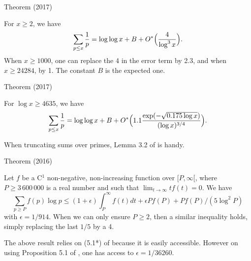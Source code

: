 \par 
\begin{thm}{Theorem (2017)}

  For $x\ge 2$, we have
  $$
  \sum_{p\le x}\frac1p=\log\log  x+B+O^*\Bigl(\frac{4}{\log^3x}\Bigr).
  $$
  When $x\ge 1000$, one can replace the 4 in the error term by 2.3,
  and when $x\ge24284$, by 1. The constant $B$ is the expected one.
\end{thm}



\par 
\begin{thm}{Theorem (2017)}

  For $\log x\ge 4635$, we have
  $$
  \sum_{p\le x}\frac1p=\log\log
  x+B+O^*\Bigl(1.1\frac{\exp(-\sqrt{0.175\log x})}{(\log x)^{3/4}}\Bigr).
  $$
\end{thm}






\par 
When truncating sums over primes, Lemma 3.2 of
\cite{Ramare*13d}
is handy.
\par 
\begin{thm}{Theorem (2016)}

  Let $f$ be a C${}^1$ non-negative, non-increasing function over
  $[P,\infty[$, where $P\ge 3\,600\,000$ is a real number and such
  that $\lim_{t\rightarrow\infty}tf(t)=0$. 
  We have
  \begin{equation*}
    \sum_{p\ge P} f(p)\log p
    \le (1+\epsilon) \int_P^\infty f(t) dt  +  \epsilon P f(P)  +  P
  f(P) / (5 \log^2 P) 
  \end{equation*}
  with $\epsilon=1/914$. When we can only ensure $P\ge2$, then a similar
  inequality holds, simply replacing the last $1/5$ by a 4.
\end{thm}


The above result  relies on (5.1*) of
\cite{Schoenfeld*76}
because it is easily accessible. However on using
Proposition 5.1 of
\cite{Dusart*07},
one has access to $\epsilon=1/36260$.

